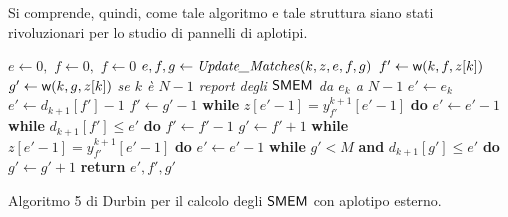 Si comprende, quindi, come tale algoritmo e tale struttura siano stati
rivoluzionari per lo studio di pannelli di aplotipi.
\begin{algorithm}
  \begin{algorithmic}[1]   
    \State $e\gets 0,\,\,f\gets 0,\,\,f\gets 0$
    \State $e,f,g\gets \mbox{\textit{Update\_Matches}}(k, z, e, f, g)$
    \EndFor
    \EndFunction
    \State
    \State $f'\gets \mbox{\rm {\sf w}}(k, f, z[k])$
    \State $g'\gets \mbox{\rm {\sf w}}(k, g, z[k])$
    \Comment\textit{{se $k$ è $N-1$ report degli $\mbox{\rm {\sf SMEM}}$ da $e_k$ a $N-1$}}
    \State $e'\gets e_k$
    \Else
    \State $e'\gets d_{k+1}[f']-1$
    \State $f'\gets g'-1$
    \State \textbf{while} $z[e'-1]=y_{f'}^{k+1}[e'-1]$ \textbf{do} $e'\gets
    e'-1$
    \State \textbf{while} $d_{k+1}[f']\leq e'$ \textbf{do} $f'\gets f'-1$
    \Else
    \State $g'\gets f'+1$
    \State \textbf{while} $z[e'-1]=y_{f'}^{k+1}[e'-1]$ \textbf{do}  $e'\gets
    e'-1$ 
    \State \textbf{while} $g'<M$ \textbf{and} $d_{k+1}[g']\leq e'$ \textbf{do}
    $g'\gets g'+1$ 
    \EndIf
    \EndIf
    \State \textbf{return} $e',f',g'$
    \EndFunction
  \end{algorithmic}
  \caption{\footnotesize{Algoritmo 5 di Durbin per il calcolo degli $\mbox{\rm {\sf SMEM}}$ con
  aplotipo esterno.}}
  \label{algo:dur5}
\end{algorithm}
